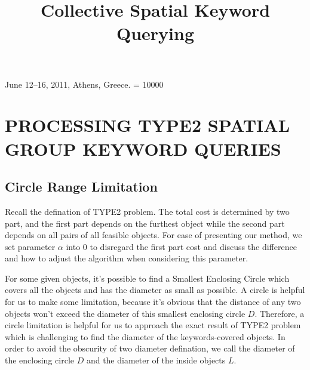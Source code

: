 \documentclass{sig-alternate}
\begin{document}
 {June 12--16, 2011, Athens, Greece.}
\widowpenalty = 10000
%

\title{Collective Spatial Keyword Querying}
%
%



\maketitle


\section{PROCESSING TYPE2 SPATIAL GROUP KEYWORD QUERIES} \label{sec:type2}
\subsection{Circle Range Limitation} \label{secsub:type2:limitation}
Recall the defination of \textsf{TYPE2} problem. The total cost is determined
by two part, and the first part depends on the furthest object while
the second part depends on all pairs of all feasible objects.
For ease of presenting our method, we set parameter $\alpha$ into 0
to disregard the first part cost and discuss the difference and how to adjust the
algorithm when considering this parameter.\par
%
For some given objects, it's possible to find a \textsf{Smallest Enclosing Circle}
which covers all the objects and has the diameter as small as possible. A circle is
helpful for us to make some limitation, because it's obvious that the distance of
any two objects won't exceed the diameter of this smallest enclosing circle $D$.
Therefore, a circle limitation is helpful for us to approach the exact result
of \textsf{TYPE2} problem which is challenging to find the diameter of the keywords-covered
objects. In order to avoid the obscurity of two diameter defination, we call the
diameter of the enclosing circle $D$ and the diameter of the inside objects $L$.\par
%
\end{document}
